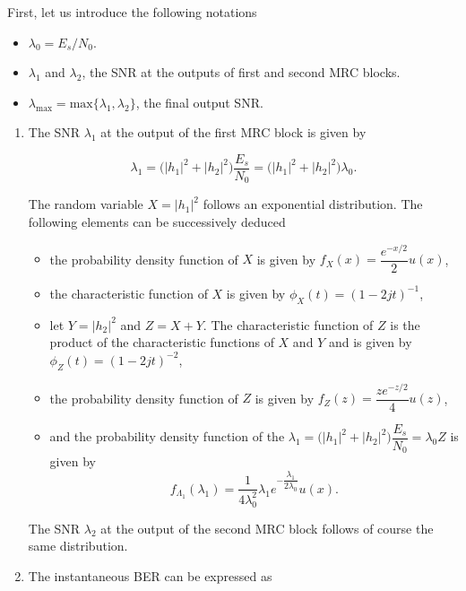 \documentclass [a4paper, 11pt] {article}
\begin{document}
    \begin{solution}
       First, let us introduce the following notations

\begin{itemize}
    \item $\lambda_0 = E_s/N_0$.
    \item $\lambda_1$ and $\lambda_2$, the SNR at the outputs of first and second MRC blocks.
    \item $\lambda_{\text{max}} = \text{max}\{\lambda_1,\lambda_2\}$, the final output SNR.
\end{itemize}

\begin{enumerate}

\item The SNR $\lambda_1$ at the output of the first MRC block is given by

\begin{equation}\lambda_1 = \big(|h_1|^2+|h_2|^2 \big) \frac{E_s}{N_0} = \big(|h_1|^2+|h_2|^2 \big) \lambda_0.
\end{equation}

The random variable $X = |h_1|^2$ follows an exponential distribution. The following elements can be successively deduced
\begin{itemize}
    \item the probability density function of $X$ is given by $ f_X(x) = \dfrac{e^{-x/2}}{2} u(x)$,
    \item the characteristic function of $X$ is given by $\phi_X(t) = (1-2 jt)^{-1}$,
    \item let $Y = |h_2|^2$ and $Z = X+Y$. The characteristic function of $Z$ is the product of the characteristic functions of $X$ and $Y$ and is given by $\phi_Z(t) = (1-2 jt)^{-2}$,
    \item the probability density function of $Z$ is given by $f_Z(z) = \dfrac{ze^{-z/2}}{4} u(z)$,
    \item and the probability density function of the $\lambda_1 = \big(|h_1|^2+|h_2|^2 \big) \dfrac{E_s}{N_0} = \lambda_0 Z$ is given by
    \begin{equation}f_{\Lambda_1}(\lambda_1) = \frac{1}{4\lambda_0^2}\lambda_1 e^{-\dfrac{\lambda_1}{2\lambda_0}} u(x).\end{equation}
\end{itemize}

The SNR $\lambda_2$ at the output of the second MRC block follows of course the same distribution.

\item The instantaneous BER can be expressed as


\end{enumerate}
\end{solution}
\end{document}
